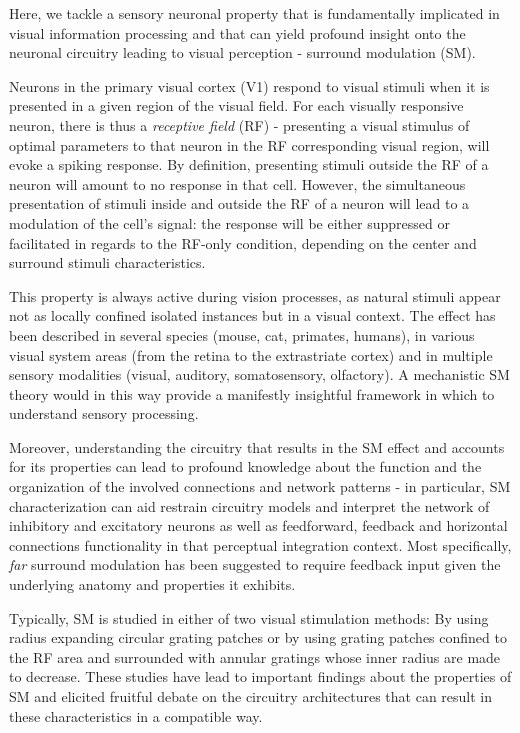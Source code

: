 Here, we tackle a sensory neuronal property that is fundamentally implicated in visual information processing and that can yield profound insight onto the neuronal circuitry leading to visual perception - surround modulation (SM).

Neurons in the primary visual cortex (V1) respond to visual stimuli when it is presented in a given region of the visual field. For each visually responsive neuron, there is thus a \textit{receptive field} (RF) - presenting a visual stimulus of optimal parameters to that neuron in the RF corresponding visual region, will evoke a spiking response. By definition, presenting stimuli outside the RF of a neuron will amount to no response in that cell.
However, the simultaneous presentation of stimuli inside and outside the RF of a neuron will lead to a modulation of the cell's signal: the response will be either suppressed or facilitated in regards to the RF-only condition, depending on the center and surround stimuli characteristics.

This property is always active during vision processes, as natural stimuli appear not as locally confined isolated instances but in a visual context. The effect has been described in several species (mouse, cat, primates, humans), in various visual system areas (from the retina to the extrastriate cortex) and in multiple sensory modalities (visual, auditory, somatosensory, olfactory). A mechanistic SM theory would in this way provide a manifestly insightful framework in which to understand sensory processing. 

Moreover, understanding the circuitry that results in the SM effect and accounts for its properties can lead to profound knowledge about the function and the organization of the involved connections and network patterns - in particular, SM characterization can aid restrain circuitry models and interpret the network of inhibitory and excitatory neurons as well as feedforward, feedback and horizontal connections functionality in that perceptual integration context. Most specifically, \textit{far} surround modulation has been suggested to require feedback input given the underlying anatomy and properties it exhibits.


Typically, SM is studied in either of two visual stimulation methods: By using radius expanding circular grating patches or by using grating patches confined to the RF area and surrounded with annular gratings whose inner radius are made to decrease. These studies have lead to important findings about the properties of SM and elicited fruitful debate on the circuitry architectures that can result in these characteristics in a compatible way.

